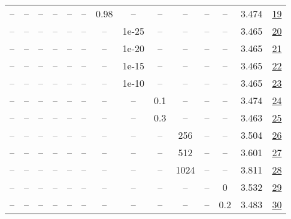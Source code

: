 \begin{table}[H]
\begin{tabular}{cccccccccccccc}
-- & -- & -- & -- & -- & -- & 0.98 & -- & -- & -- & -- & -- & 3.474 & \href{https://wandb.ai/stanford-mercury/optimizer-scaling/runs/sweep-130m-2B-muon076dd0lr0.016-wd0.1-minlr0-warmup0-b10.8-b20.9-07654a}{19} \\
-- & -- & -- & -- & -- & -- & -- & 1e-25 & -- & -- & -- & -- & 3.465 & \href{https://wandb.ai/stanford-mercury/optimizer-scaling/runs/sweep-130m-2B-muon978ba9lr0.016-wd0.1-minlr0-warmup0-b10.8-b20.9-d1c853}{20} \\
-- & -- & -- & -- & -- & -- & -- & 1e-20 & -- & -- & -- & -- & 3.465 & \href{https://wandb.ai/stanford-mercury/optimizer-scaling/runs/sweep-130m-2B-muona3753elr0.016-wd0.1-minlr0-warmup0-b10.8-b20.9-2408aa}{21} \\
-- & -- & -- & -- & -- & -- & -- & 1e-15 & -- & -- & -- & -- & 3.465 & \href{https://wandb.ai/stanford-mercury/optimizer-scaling/runs/sweep-130m-2B-muonbe2964lr0.016-wd0.1-minlr0-warmup0-b10.8-b20.9-764b29}{22} \\
-- & -- & -- & -- & -- & -- & -- & 1e-10 & -- & -- & -- & -- & 3.465 & \href{https://wandb.ai/stanford-mercury/optimizer-scaling/runs/sweep-130m-2B-muonfa5af4lr0.016-wd0.1-minlr0-warmup0-b10.8-b20.9-07fc5f}{23} \\
-- & -- & -- & -- & -- & -- & -- & -- & 0.1 & -- & -- & -- & 3.474 & \href{https://wandb.ai/stanford-mercury/optimizer-scaling/runs/sweep-130m-2B-muon89fb4blr0.016-wd0.1-minlr0-warmup0-b10.8-b20.9-2c3744}{24} \\
-- & -- & -- & -- & -- & -- & -- & -- & 0.3 & -- & -- & -- & 3.463 & \href{https://wandb.ai/stanford-mercury/optimizer-scaling/runs/sweep-130m-2B-muon19b6eclr0.016-wd0.1-minlr0-warmup0-b10.8-b20.9-d27415}{25} \\
-- & -- & -- & -- & -- & -- & -- & -- & -- & 256 & -- & -- & 3.504 & \href{https://wandb.ai/stanford-mercury/optimizer-scaling/runs/sweep-130m-2B-muonbc742flr0.016-wd0.1-minlr0-warmup0-b10.8-b20.9-e61596}{26} \\
-- & -- & -- & -- & -- & -- & -- & -- & -- & 512 & -- & -- & 3.601 & \href{https://wandb.ai/stanford-mercury/optimizer-scaling/runs/sweep-130m-2B-muone42c7clr0.016-wd0.1-minlr0-warmup0-b10.8-b20.9-d56e40}{27} \\
-- & -- & -- & -- & -- & -- & -- & -- & -- & 1024 & -- & -- & 3.811 & \href{https://wandb.ai/stanford-mercury/optimizer-scaling/runs/sweep-130m-2B-muon556411lr0.016-wd0.1-minlr0-warmup0-b10.8-b20.9-bd403a}{28} \\
-- & -- & -- & -- & -- & -- & -- & -- & -- & -- & -- & 0 & 3.532 & \href{https://wandb.ai/stanford-mercury/optimizer-scaling/runs/sweep-130m-2B-muonb7380elr0.016-wd0-minlr0-warmup0-b10.8-b20.98--856a75}{29} \\
-- & -- & -- & -- & -- & -- & -- & -- & -- & -- & -- & 0.2 & 3.483 & \href{https://wandb.ai/stanford-mercury/optimizer-scaling/runs/sweep-130m-2B-muon8000c8lr0.016-wd0.2-minlr0-warmup0-b10.8-b20.9-60a749}{30} \\
\bottomrule
\end{tabular}
\end{table}


